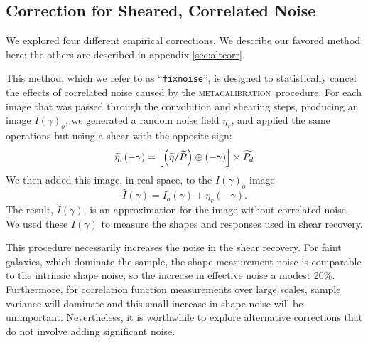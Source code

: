 \documentclass[iop]{emulateapj}
\newcommand{\mcal}{\textsc{metacalibration}}
\newcommand{\ntil}{\mbox{$\widetilde{\eta}$}}
\newcommand{\Ptil}{\mbox{$\widetilde{P}$}}
\newcommand{\Ptild}{\mbox{$\widetilde{P_d}$}}
\newcommand{\fixnoise}{\texttt{fixnoise}}
\begin{document}


\subsection{Correction for Sheared, Correlated Noise} \label{sec:fixnoise}


We explored four different empirical corrections.  We describe our favored
method here; the others are described in appendix \ref{sec:altcorr}.

This method, which we refer to as ``\fixnoise'', is designed to statistically
cancel the effects of correlated noise caused by the \mcal\ procedure.  For each
image that was passed through the convolution and shearing steps, producing
an image $I(\gamma)_o$, we generated a random noise field
$\eta_r$, and applied the same operations but using a shear with
the opposite sign:
\begin{equation}
    \widetilde{\eta}_r(-\gamma) = \left[ \left( \ntil/\Ptil \right) \oplus (-\gamma) \right] \times \Ptild  \nonumber \\
\end{equation}
We then added this image, in real space, to the $I(\gamma)_o$ image
\begin{equation}
    \hat{I}(\gamma) = I_o(\gamma) + \eta_r(-\gamma).
\end{equation}
The result, $\hat{I}(\gamma)$, is an approximation for the image
without correlated noise.
We used these $\hat{I}(\gamma)$ to measure the shapes and responses used in
shear recovery.  

This procedure necessarily increases the noise in the shear recovery.  For
faint galaxies, which dominate the sample, the shape measurement noise is
comparable to the intrinsic shape noise, so the increase in effective noise
a modest 20\%.  Furthermore, for correlation function measurements over
large scales, sample variance will dominate and this small increase in shape
noise will be unimportant.  Nevertheless, it is worthwhile to explore
alternative corrections that do not involve adding significant noise.
\end{document}
